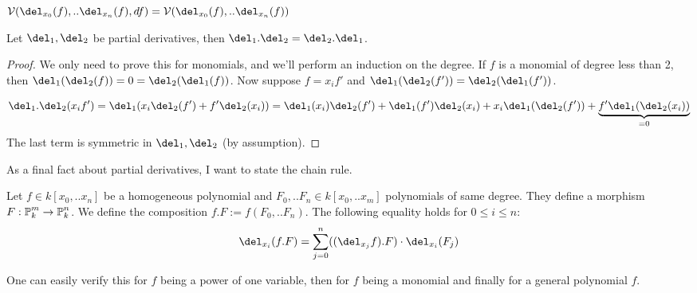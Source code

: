 \begin{corollary}
$\V(\del_{x_0}(f),..\del_{x_n}(f), df) = \V(\del_{x_0}(f),..\del_{x_n}(f))$
\end{corollary}

\begin{lemma} \label{lemmaPartialDerivativesCommute}
Let $\del_1,\del_2$ be partial derivatives, then $\del_1.\del_2 = \del_2.\del_1$.
\end{lemma}
\begin{proof}
We only need to prove this for monomials, and we'll perform an induction on the degree.
If $f$ is a monomial of degree less than 2, then $\del_1(\del_2(f)) = 0 = \del_2(\del_1(f))$. 
Now suppose $f = x_if'$ and $\del_1(\del_2(f')) = \del_2(\del_1(f'))$.

\begin{equation}
\del_1.\del_2(x_if') = \del_1(x_i\del_2(f') + f'\del_2(x_i)) = 
\del_1(x_i)\del_2(f') + \del_1(f')\del_2(x_i) + x_i\del_1(\del_2(f')) + \underset{=0}{\underbrace{f'\del_1(\del_2(x_i))}}
\end{equation}
The last term is symmetric in $\del_1,\del_2$ (by assumption).
\end{proof}

As a final fact about partial derivatives, I want to state the chain rule.
\begin{lemma}
Let $f \in k[x_0,..x_n]$ be a homogeneous polynomial and $F_0,..F_n \in k[x_0,..x_m]$ polynomials of same degree. They define a morphism $F : \operatorname{\mathbb P}^m_k \to \operatorname{\mathbb P}^n_k$. We define the composition $f.F := f(F_0,..F_n)$. The following equality holds for $0 \leq i \leq n$:
\begin{equation}
\del_{x_i} (f.F) = \sum_{j=0}^n ((\del_{x_j}f).F) \cdot \del_{x_i}(F_j)
\end{equation}
\end{lemma}
One can easily verify this for $f$ being a power of one variable, then for $f$ being a monomial and finally for a general polynomial $f$.

